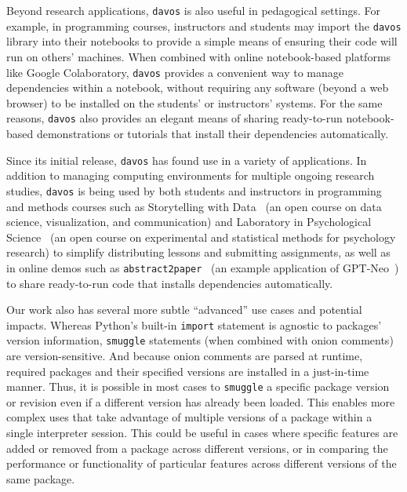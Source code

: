 \documentclass[preprint,12pt,a4paper]{elsarticle}
\begin{document}
Beyond research applications, \texttt{davos} is also useful in
pedagogical settings. For example, in programming courses,
instructors and students may import the \texttt{davos} library into
their notebooks to provide a simple means of ensuring their code will
run on others' machines. When combined with online notebook-based
platforms like Google Colaboratory, \texttt{davos} provides a
convenient way to manage dependencies within a notebook, without
requiring any software (beyond a web browser) to be installed on the
students' or instructors' systems. For the same reasons,
\texttt{davos} also provides an elegant means of sharing ready-to-run
notebook-based demonstrations or tutorials that install their dependencies
automatically.

Since its initial release, \texttt{davos} has found use in a variety
of applications. In addition to managing computing environments
for multiple ongoing research studies, \texttt{davos} is being used by
both students and instructors in programming and methods courses such as
Storytelling with Data~\cite{Mann21d} (an open course on data science,
visualization, and communication) and Laboratory in Psychological
Science~\cite{Mann22} (an open course on experimental and statistical
methods for psychology research) to simplify distributing lessons and
submitting assignments, as well as in online demos such as
\texttt{abstract2paper}~\cite{Mann21e} (an example application of
GPT-Neo~\cite{GaoEtal20, BlacEtal21}) to share ready-to-run code that
installs dependencies automatically.

Our work also has several more subtle ``advanced'' use cases and
potential impacts. Whereas Python's built-in \texttt{import}
statement is agnostic to packages' version information, \texttt{smuggle}
statements (when combined with onion comments) are version-sensitive.
And because onion comments are parsed at runtime, required packages and
their specified versions are installed in a just-in-time manner. Thus, it is possible
in most cases to \texttt{smuggle} a specific package version or revision even if
a different version has already been loaded. This enables more complex uses
that take advantage of multiple versions of a package within a single interpreter
session. This could be useful in cases where specific features are added or
removed from a package across different versions, or in comparing the
performance or functionality of particular features across different versions of
the same package.
\end{document}

